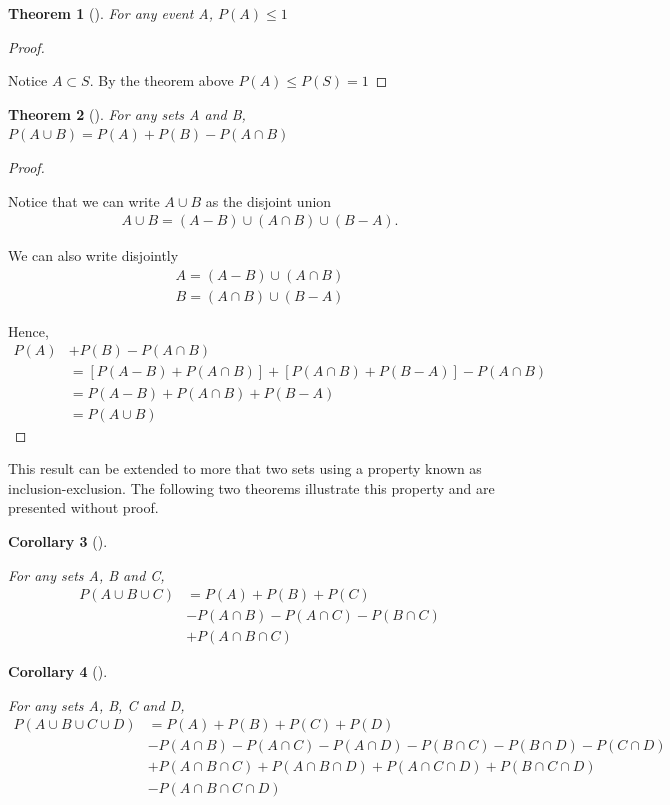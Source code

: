 \documentclass[10pt,]{book}
\theoremstyle{plain}
\newtheorem{theorem}{Theorem}[section]
\newtheorem{corollary}[theorem]{Corollary}
\theoremstyle{definition}
\theoremstyle{definition}
\theoremstyle{definition}
\numberwithin{equation}{section}
\begin{document}
\begin{theorem}[{}]\label{ProbabilityLessThanOne}
For any event A, \(P(A) \le 1\)\end{theorem}
\begin{proof}\hypertarget{proof-13}{}
Notice \(A \subset S\). By the theorem above \( P(A) \le P(S) = 1\)%
\end{proof}
\begin{theorem}[{}]\label{ProbabilityTwoUnions}
For any sets A and B, \(P(A \cup B) = P(A) + P(B) - P(A \cap B)\)\end{theorem}
\begin{proof}\hypertarget{proof-14}{}
Notice that we can write \(A \cup B\) as the disjoint union%
\begin{gather*}
A \cup B = (A-B) \cup (A \cap B) \cup (B-A).
\end{gather*}\par
We can also write disjointly%
\begin{gather*}
A = (A-B) \cup (A \cap B)\\
B = (A \cap B) \cup (B-A)
\end{gather*}\par
Hence, %
\begin{align*}
P(A) & + P(B) - P(A \cap B) \\
& = [P(A-B) + P(A \cap B)] + [P(A \cap B) + P(B-A)] - P(A \cap B)\\
& = P(A-B) + P(A \cap B) + P(B-A)\\
& = P(A \cup B)
\end{align*}\end{proof}
\par
This result can be extended to more that two sets using a property known as inclusion-exclusion. The
	following two theorems illustrate this property and are presented without proof.
\begin{corollary}[{}]\label{ProbabilityThreeUnions}

			For any sets A, B and C, 
			\begin{align*}
P(A \cup B \cup C) & = P(A) + P(B) + P(C)\\
& - P(A \cap B) - P(A \cap C) - P(B \cap C) \\
& + P(A \cap B \cap C)
\end{align*}\end{corollary}
\begin{corollary}[{}]\label{ProbabilityFourUnions}

			For any sets A, B, C and D, 
			\begin{align*}
P(A \cup B \cup C \cup D) & = P(A) + P(B) + P(C) + P(D)\\
& - P(A \cap B) - P(A \cap C) - P(A \cap D)  - P(B \cap C) - P(B \cap D) - P(C \cap D)\\
& + P(A \cap B \cap C) + P(A \cap B \cap D) + P(A \cap C \cap D) + P(B \cap C \cap D)\\
& - P(A \cap B \cap C \cap D)
\end{align*}\end{corollary}
\par
\end{document}
